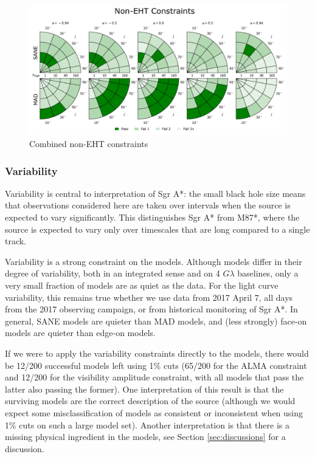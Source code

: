\begin{figure}
  \centering
  \includegraphics[width=\columnwidth]{./figures/Non_Interferometric_Constraints.png}
  \caption{Combined non-EHT constraints}
  \label{fig:non_eht_cuts}
\end{figure}

\subsubsection{Variability}

Variability is central to interpretation of Sgr A*: the small black hole size means that observations considered here are taken over intervals when the source is expected to vary significantly.  This distinguishes Sgr A* from M87*, where the source is expected to vary only over timescales that are long compared to a single track.

Variability is a strong constraint on the models.  Although models differ in their degree of variability, both in an integrated sense and on 4 $G\lambda$ baselines, only a very small fraction of models are as quiet as the data.  For the light curve variability, this remains true whether we use data from 2017 April 7, all days from the 2017 observing campaign, or from historical monitoring of Sgr A*.   In general, SANE models are quieter than MAD models, and (less strongly) face-on models are quieter than edge-on models.

If we were to apply the variability constraints directly to the models, there would be 12/200 successful models left using 1\% cuts (65/200 for the ALMA constraint and 12/200 for the visibility amplitude constraint, with all models that pass the latter also passing the former).  One interpretation of this result is that the surviving models are the correct description of the source (although we would expect some misclassification of models as consistent or inconsistent when using 1\% cuts on such a large model set).  Another interpretation is that there is a missing physical ingredient in the models, see Section \ref{sec:discussions} for a discussion.


